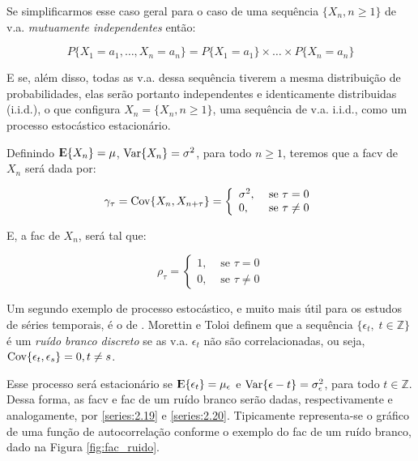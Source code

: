 Se simplificarmos esse caso geral para o caso de uma sequência $\{ X_n , n \geq 1 \}$ de v.a. \emph{mutuamente independentes} então:

\[ P\{X_1 = a_1, \ldots, X_n = a_n\} = P\{X_1 = a_1\}\times\ldots\times P\{X_n = a_n\} \]

E se, além disso, todas as v.a. dessa sequência tiverem a mesma distribuição de probabilidades, elas serão portanto independentes e identicamente distribuidas (i.i.d.), o que configura $X_n = \{ X_n , n \geq 1 \}$, uma sequência de v.a. i.i.d., como um processo estocástico estacionário.

Definindo ${\rm I\kern-.3em E}\{X_n\} = \mu$, $\mathrm{Var}\{X_n\} = \sigma^2$, para todo $n \geq 1$, teremos que a facv de $X_n$ será dada por:

\begin{equation}\label{series:2.19}
\gamma_\tau = \mathrm{Cov}\{X_n, X_{n+\tau}\} = \left\{\begin{array}{lr} \sigma^2, & \text{ se } \tau = 0 \\ 0, & \text{ se } \tau \neq 0 \end{array}\right.
\end{equation}

E, a fac de $X_n$, será tal que:

\begin{equation}\label{series:2.20}
\rho_\tau = \left\{\begin{array}{lr} 1, & \text{ se } \tau = 0 \\ 0, & \text{ se } \tau \neq 0 \end{array}\right.
\end{equation}

Um segundo exemplo de processo estocástico, e muito mais útil para os estudos de séries temporais, é o de . Morettin e Toloi \citep{morettin} definem que a sequência $\{\epsilon_t,\; t \in \mathbb{Z}\}$ é um \emph{ruído branco discreto} se as v.a. $\epsilon_t$ não são correlacionadas, ou seja, $\mathrm{Cov}\{\epsilon_t, \epsilon_s\} = 0, t \neq s$.

Esse processo será estacionário se ${\rm I\kern-.3em E}\{\epsilon_t\} = \mu_\epsilon$ e $\mathrm{Var}\{\epsilon-t\} = \sigma_\epsilon^2$, para todo $t \in \mathbb{Z}$. Dessa forma, as facv e fac de um ruído branco serão dadas, respectivamente e analogamente, por \ref{series:2.19} e \ref{series:2.20}. Tipicamente representa-se o gráfico de uma função de autocorrelação conforme o exemplo do fac de um ruído branco, dado na Figura \ref{fig:fac_ruido}.

